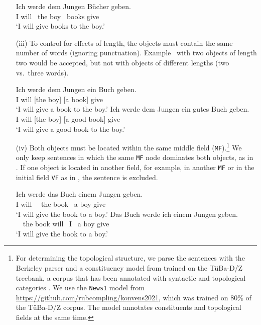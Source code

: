 \documentclass[output=paper,colorlinks,citecolor=brown]{langscibook}
\begin{document}
\begin{enumerate}
\ea\label{ex:indef-zero}
    \gll Ich werde \up{[}dem Jungen\up{/\texttt{DA}]\sub{\textsc{dat}}} \up{[}Bücher\up{/\texttt{OA}]\sub{\textsc{acc}}} geben. \\
    I will {\ the} boy {\ books} give \\
    \glt `I will give books to the boy.'
\z
    
  \item[(iii)] To control for effects of length, the objects must contain the same number of words (ignoring punctuation). 
  Example~ with two objects of length two would be accepted, but not  with objects of different lengths (two vs.\ three words).

\ea  
   \ea\label{ex:same-length}
   \gll Ich werde \up{[}dem Jungen\up{]\sub{\textsc{dat}}} \up{[}ein Buch\up{]\sub{\textsc{acc}}} geben. \\
   I will [the boy] [a book] give \\
   \glt `I will give a book to the boy.'
%   
   \ex\label{ex:different-length}
   \gll Ich werde \up{[}dem Jungen\up{]\sub{\textsc{dat}}} \up{[}ein gutes Buch\up{]\sub{\textsc{acc}}} geben. \\
   I will [the boy] [a good book] give \\
   \glt `I will give a good book to the boy.'
   \z
\z

   
  \item[(iv)] Both objects must be located within the same middle field (\texttt{MF}).\footnote{For determining the topological structure, we parse the sentences with the Berkeley parser \citep{petrov-et-al06} and a constituen\-cy model from \citet{ortmann21} trained on the TüBa-D/Z treebank, a corpus that has been annotated with syntactic and topological categories \citep{telljohann-et-al17}. We use the \texttt{News1} model from \url{https://github.com/rubcompling/konvens2021}, which was trained on 80\% of the TüBa-D/Z corpus. The model annotates constituents and topological fields at the same time.}
  We only keep sentences in which the same \texttt{MF} node dominates both objects, as in . If one object is located in another field, for example, in another \texttt{MF} or in the initial field \texttt{VF} as in , the sentence is excluded.
  
\ea
   \ea\label{ex:same-mf}
   \gll Ich werde \up{$\lsem$[}das Buch\up{]\sub{\textsc{acc}}} \up{[}einem Jungen\up{]\sub{\textsc{dat}}$\rsem$\subtt{MF}} geben. \\
    I will {\ \ the} book {\ a} boy give \\
    \glt `I will give the book to a boy.'
    \ex\label{ex:not-same-mf}
    \gll \up{$\lsem$[}Das Buch\up{]\sub{\textsc{acc}}$\rsem$\subtt{VF}} werde \up{$\lsem$}ich \up{[}einem Jungen\up{]\sub{\textsc{dat}}$\rsem$\subtt{MF}} geben. \\
  {\ \ the} book will {\ I} {\ a} boy give \\
    \glt `I will give the book to a boy.'
    \z
\z
    

\end{enumerate}
\end{document}
